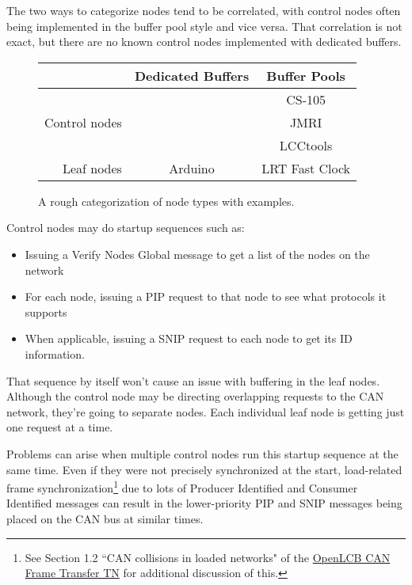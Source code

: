 \documentclass[11pt]{article}
\begin{document}
The two ways to categorize nodes tend to be correlated, with
control nodes often being implemented in the buffer pool style
and vice versa. 
That correlation is not exact, but there are no known 
control nodes implemented with dedicated buffers.

\begin{figure}[!h]
\begin{center}
\begin{tabular}{ r || c | c}
\hline
& Dedicated Buffers & Buffer Pools \\ \hline \hline
  ~            &   &    CS-105    \\
Control nodes  & ~ &    JMRI      \\
  ~            & ~ &    LCCtools  \\ \hline
Leaf nodes    & Arduino & LRT Fast Clock\\ \hline
\end{tabular}
\end{center}
\caption{A rough categorization of node types with examples.}
\label{fig:node-types}
\end{figure}


Control nodes may do startup sequences such as:
\begin{itemize}
\item Issuing a Verify Nodes Global message to get a list of the nodes on the network
\item For each node, issuing a PIP request to that node to see what protocols it supports
\item When applicable, issuing a SNIP request to each node to get its ID information.
\end{itemize}

That sequence by itself won't cause an issue with buffering in the leaf nodes.  
Although the control node may be directing overlapping requests to the CAN network,
they're going to separate nodes.
Each individual leaf node is getting just one request at a time.

Problems can arise when multiple control nodes run this startup sequence at the same 
time.  Even if they were not precisely synchronized at the start, load-related frame 
synchronization\footnote{See Section 1.2 ``CAN collisions in loaded networks" of the 
    \href{https://nbviewer.org/github/openlcb/documents/blob/master/standards/CanFrameTransferTN.pdf}{OpenLCB CAN Frame Transfer TN}
    for additional discussion of this.}
due to lots of Producer Identified and Consumer Identified messages can 
result in the lower-priority PIP and SNIP messages being placed on the CAN bus at similar times.
\end{document}
